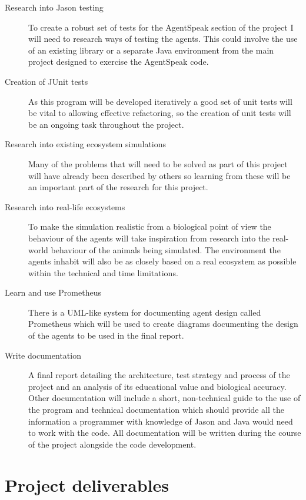 \documentclass[11pt,fleqn,twoside]{article}
\begin{document}
\begin{description}
\begin{itemize}
	\end{itemize}
	\item[Research into Jason testing] To create a robust set of tests for the AgentSpeak section of the project I will need to research ways of testing the agents. This could involve the use of an existing library or a separate Java environment from the main project designed to exercise the AgentSpeak code.
	\item[Creation of JUnit tests] As this program will be developed iteratively a good set of unit tests will be vital to allowing effective refactoring, so the creation of unit tests will be an ongoing task throughout the project.
	\item[Research into existing ecosystem simulations] Many of the problems that will need to be solved as part of this project will have already been described by others so learning from these will be an important part of the research for this project.
	\item[Research into real-life ecosystems] To make the simulation realistic from a biological point of view the behaviour of the agents will take inspiration from research into the real-world behaviour of the animals being simulated. The environment the agents inhabit will also be as closely based on a real ecosystem as possible within the technical and time limitations.
	\item[Learn and use Prometheus] There is a UML-like system for documenting agent design called Prometheus which will be used to create diagrams documenting the design of the agents to be used in the final report.
	\item[Write documentation] A final report detailing the architecture, test strategy and process of the project and an analysis of its educational value and biological accuracy. Other documentation will include a short, non-technical guide to the use of the program and technical documentation which should provide all the information a programmer with knowledge of Jason and Java would need to work with the code. All documentation will be written during the course of the project alongside the code development.
\end{description}

\section{Project deliverables}
\end{document}
